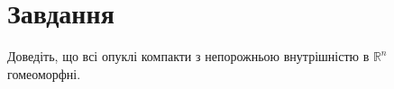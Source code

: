 
\chapter{Завдання \theHchapter}

\begin{tcolorbox}[title=Завдання]
    Доведіть, що всі опуклі компакти з непорожньою
    внутрішністю в $\mathbb{R}^{n}$ гомеоморфні.
\end{tcolorbox}



